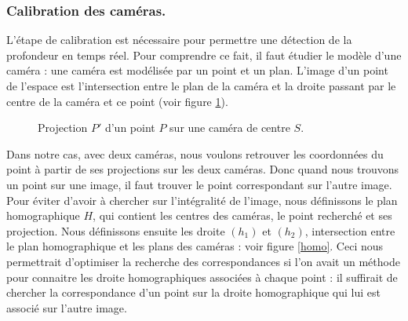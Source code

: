 \documentclass{article}
\begin{document}
\subsubsection{Calibration des caméras.}
L'étape de calibration est nécessaire pour permettre une détection de la profondeur en temps réel. Pour comprendre ce fait, il faut étudier le modèle d'une caméra : une caméra est modélisée par un point et un plan. L'image d'un point de l'espace est l'intersection entre le plan de la caméra et la droite passant par le centre de la caméra et ce point (voir figure \ref{projection}).

\begin{figure}
    \begin{center}
    \end{center}
    \caption{Projection $P'$ d'un point $P$ sur une caméra de centre $S$.}
    \label{projection}
\end{figure}

Dans notre cas, avec deux caméras, nous voulons retrouver les coordonnées du point à partir de ses projections sur les deux caméras. Donc quand nous trouvons un point sur une image, il faut trouver le point correspondant sur l'autre image. Pour éviter d'avoir à chercher sur l'intégralité de l'image, nous définissons le plan homographique $H$, qui contient les centres des caméras, le point recherché et ses projection. Nous définissons ensuite les droite $(h_1)$ et $(h_2)$, intersection entre le plan homographique et les plans des caméras : voir figure \ref{homo}. Ceci nous permettrait d'optimiser la recherche des correspondances si l'on avait un méthode pour connaitre les droite homographiques associées à chaque point : il suffirait de chercher la correspondance d'un point sur la droite homographique qui lui est associé sur l'autre image.
\end{document}
